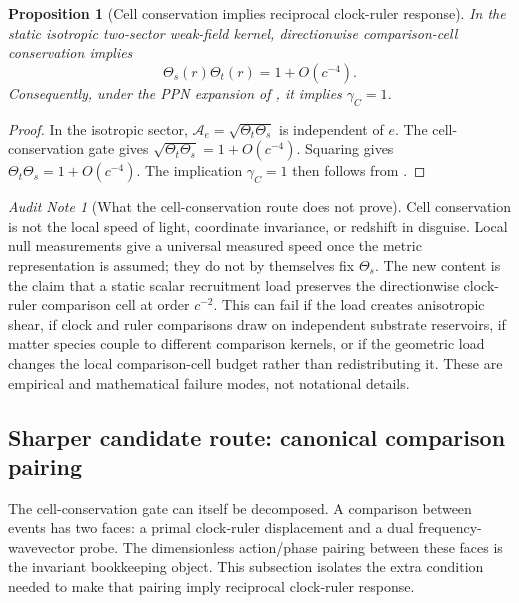 \documentclass[11pt]{article}
\newtheorem{proposition}[theorem]{Proposition}
\theoremstyle{remark}
\newtheorem{audit}[theorem]{Audit Note}
\begin{document}
\begin{proposition}[Cell conservation implies reciprocal clock-ruler response]
\label{prop:cell-implies-reciprocal}
In the static isotropic two-sector weak-field kernel, directionwise comparison-cell conservation implies
\[
        \Theta_s(r)\Theta_t(r)=1+O(c^{-4}).
\]
Consequently, under the PPN expansion of , it implies \(\gamma_C=1\).
\end{proposition}

\begin{proof}
In the isotropic sector, \(\mathcal A_e=\sqrt{\Theta_t\Theta_s}\) is independent of \(e\).  The cell-conservation gate gives \(\sqrt{\Theta_t\Theta_s}=1+O(c^{-4})\).  Squaring gives \(\Theta_t\Theta_s=1+O(c^{-4})\).  The implication \(\gamma_C=1\) then follows from .
\end{proof}

\begin{audit}[What the cell-conservation route does not prove]
Cell conservation is not the local speed of light, coordinate invariance, or redshift in disguise.  Local null measurements give a universal measured speed once the metric representation is assumed; they do not by themselves fix \(\Theta_s\).  The new content is the claim that a static scalar recruitment load preserves the directionwise clock-ruler comparison cell at order \(c^{-2}\).  This can fail if the load creates anisotropic shear, if clock and ruler comparisons draw on independent substrate reservoirs, if matter species couple to different comparison kernels, or if the geometric load changes the local comparison-cell budget rather than redistributing it.  These are empirical and mathematical failure modes, not notational details.
\end{audit}


\subsection{Sharper candidate route: canonical comparison pairing}

The cell-conservation gate can itself be decomposed.  A comparison between events has two faces: a primal clock-ruler displacement and a dual frequency-wavevector probe.  The dimensionless action/phase pairing between these faces is the invariant bookkeeping object.  This subsection isolates the extra condition needed to make that pairing imply reciprocal clock-ruler response.
\end{document}
